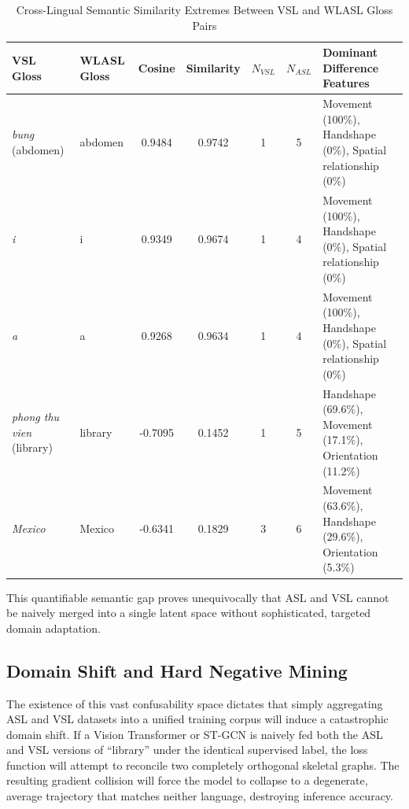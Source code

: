 \documentclass{ieeeaccess}
\begin{document}
\begin{table}[!t]
\caption{Cross-Lingual Semantic Similarity Extremes Between VSL and WLASL Gloss Pairs}
\label{tab:similarity_extremes}
\centering
\small
\setlength{\tabcolsep}{5pt}
\begin{tabular}{llccccp{6.2cm}}
\toprule
\textbf{VSL Gloss} &
\textbf{WLASL Gloss} &
\textbf{Cosine} &
\textbf{Similarity} &
\textbf{$N_{VSL}$} &
\textbf{$N_{ASL}$} &
\textbf{Dominant Difference Features} \\
\midrule

\textit{bung} (abdomen) &
abdomen &
0.9484 &
0.9742 &
1 &
5 &
Movement (100\%), Handshape (0\%), Spatial relationship (0\%) \\

\textit{i} &
i &
0.9349 &
0.9674 &
1 &
4 &
Movement (100\%), Handshape (0\%), Spatial relationship (0\%) \\

\textit{a} &
a &
0.9268 &
0.9634 &
1 &
4 &
Movement (100\%), Handshape (0\%), Spatial relationship (0\%) \\

\midrule

\textit{phong thu vien} (library) &
library &
-0.7095 &
0.1452 &
1 &
5 &
Handshape (69.6\%), Movement (17.1\%), Orientation (11.2\%) \\

\textit{Mexico} &
Mexico &
-0.6341 &
0.1829 &
3 &
6 &
Movement (63.6\%), Handshape (29.6\%), Orientation (5.3\%) \\

\bottomrule
\end{tabular}
\end{table}

This quantifiable semantic gap proves unequivocally that ASL and VSL cannot be naively merged into a single latent space without sophisticated, targeted domain adaptation. 

\subsection{Domain Shift and Hard Negative Mining} 
The existence of this vast confusability space dictates that simply aggregating ASL and VSL datasets into a unified training corpus will induce a catastrophic domain shift. If a Vision Transformer or ST-GCN is naively fed both the ASL and VSL versions of ``library'' under the identical supervised label, the loss function will attempt to reconcile two completely orthogonal skeletal graphs. The resulting gradient collision will force the model to collapse to a degenerate, average trajectory that matches neither language, destroying inference accuracy.
\end{document}
